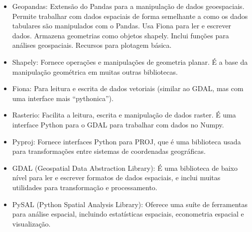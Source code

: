 \documentclass[letterpaper,10pt,english]{jupyterBook}
\begin{document}
\sphinxAtStartPar
{}
\begin{itemize}
\item {} 
\sphinxAtStartPar
Geopandas: Extensão do Pandas para a manipulação de dados geoespaciais. Permite trabalhar com dados espaciais de forma semelhante a como os dados tabulares são manipulados com o Pandas. Usa Fiona para ler e escrever dados. Armazena geometrias como objetos shapely. Inclui funções para análises geospaciais. Recursos para plotagem básica.

\item {} 
\sphinxAtStartPar
Shapely: Fornece operações e manipulações de geometria planar. É a base da manipulação geométrica em muitas outras bibliotecas.

\item {} 
\sphinxAtStartPar
Fiona: Para leitura e escrita de dados vetoriais (similar ao GDAL, mas com uma interface mais “pythonica”).

\end{itemize}

\sphinxAtStartPar
{}
\begin{itemize}
\item {} 
\sphinxAtStartPar
Rasterio: Facilita a leitura, escrita e manipulação de dados raster. É uma interface Python para o GDAL para trabalhar com dados no Numpy.

\item {} 
\sphinxAtStartPar
Pyproj: Fornece interfaces Python para PROJ, que é uma biblioteca usada para transformações entre sistemas de coordenadas geográficas.

\end{itemize}

\sphinxAtStartPar
{}
\begin{itemize}
\item {} 
\sphinxAtStartPar
GDAL (Geospatial Data Abstraction Library): É uma biblioteca de baixo nível para ler e escrever formatos de dados espaciais, e inclui muitas utilidades para transformação e processamento.

\end{itemize}

\sphinxAtStartPar
{}
\begin{itemize}
\item {} 
\sphinxAtStartPar
PySAL (Python Spatial Analysis Library): Oferece uma suíte de ferramentas para análise espacial, incluindo estatísticas espaciais, econometria espacial e visualização.

\end{itemize}
\end{document}
